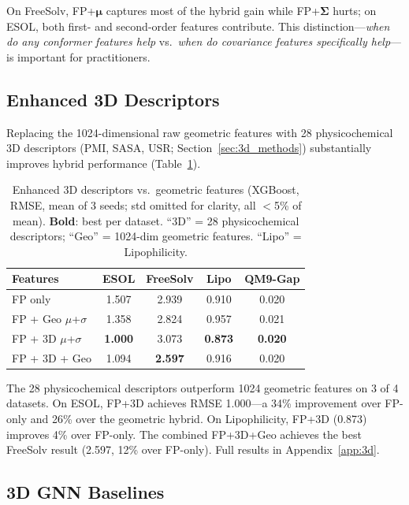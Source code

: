 \documentclass[sigconf]{acmart}
\begin{document}
On FreeSolv, FP+$\boldsymbol{\mu}$ captures most of the hybrid gain while FP+$\boldsymbol{\Sigma}$ hurts; on ESOL, both first- and second-order features contribute. This distinction---\emph{when do any conformer features help} vs.\ \emph{when do covariance features specifically help}---is important for practitioners.

\subsection{Enhanced 3D Descriptors}
\label{sec:3d_desc}

Replacing the 1024-dimensional raw geometric features with 28 physicochemical 3D descriptors (PMI, SASA, USR; Section~\ref{sec:3d_methods}) substantially improves hybrid performance (Table~\ref{tab:3d}).

\begin{table}[!htb]
\caption{Enhanced 3D descriptors vs.\ geometric features (XGBoost, RMSE, mean of 3 seeds; std omitted for clarity, all $<$5\% of mean). \textbf{Bold}: best per dataset. ``3D'' = 28 physicochemical descriptors; ``Geo'' = 1024-dim geometric features. ``Lipo'' = Lipophilicity.}
\label{tab:3d}
\centering
\small
\begin{tabular}{@{}lcccc@{}}
\toprule
Features & ESOL & FreeSolv & Lipo & QM9-Gap \\
\midrule
FP only            & 1.507 & 2.939 & 0.910 & 0.020 \\
FP + Geo $\mu$+$\sigma$ & 1.358 & 2.824 & 0.957 & 0.021 \\
FP + 3D $\mu$+$\sigma$  & \textbf{1.000} & 3.073 & \textbf{0.873} & \textbf{0.020} \\
FP + 3D + Geo      & 1.094 & \textbf{2.597} & 0.916 & 0.020 \\
\bottomrule
\end{tabular}
\end{table}

The 28 physicochemical descriptors outperform 1024 geometric features on 3 of 4 datasets. On ESOL, FP+3D achieves RMSE 1.000---a 34\% improvement over FP-only and 26\% over the geometric hybrid. On Lipophilicity, FP+3D (0.873) improves 4\% over FP-only. The combined FP+3D+Geo achieves the best FreeSolv result (2.597, 12\% over FP-only). Full results in Appendix~\ref{app:3d}.

\subsection{3D GNN Baselines}
\label{sec:schnet}
\end{document}
